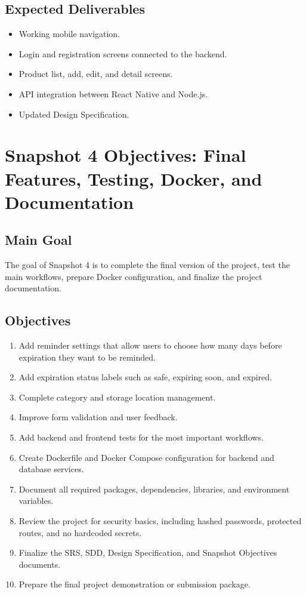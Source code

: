 \documentclass[12pt]{article}
\begin{document}
\subsection{Expected Deliverables}
\begin{itemize}[leftmargin=*]
    \item Working mobile navigation.
    \item Login and registration screens connected to the backend.
    \item Product list, add, edit, and detail screens.
    \item API integration between React Native and Node.js.
    \item Updated Design Specification.
\end{itemize}

\section{Snapshot 4 Objectives: Final Features, Testing, Docker, and Documentation}

\subsection{Main Goal}
The goal of Snapshot 4 is to complete the final version of the project, test the main workflows, prepare Docker configuration, and finalize the project documentation.

\subsection{Objectives}
\begin{enumerate}[leftmargin=*]
    \item Add reminder settings that allow users to choose how many days before expiration they want to be reminded.
    \item Add expiration status labels such as safe, expiring soon, and expired.
    \item Complete category and storage location management.
    \item Improve form validation and user feedback.
    \item Add backend and frontend tests for the most important workflows.
    \item Create Dockerfile and Docker Compose configuration for backend and database services.
    \item Document all required packages, dependencies, libraries, and environment variables.
    \item Review the project for security basics, including hashed passwords, protected routes, and no hardcoded secrets.
    \item Finalize the SRS, SDD, Design Specification, and Snapshot Objectives documents.
    \item Prepare the final project demonstration or submission package.
\end{enumerate}
\end{document}
